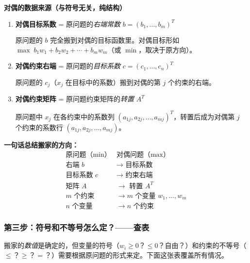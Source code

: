 \begin{defbox}
\textbf{对偶的数据来源（与符号无关，纯结构）}

\medskip
\begin{enumerate}
  \item \textbf{对偶目标系数} = 原问题的\emph{右端常数} $b = (b_1,\dots,b_m)^T$

  原问题的 $b$ 完全搬到对偶的目标函数里。对偶目标形如 $\max\; b_1 w_1 + b_2 w_2 + \cdots + b_m w_m$（或 $\min$，取决于原方向）。

  \item \textbf{对偶约束右端} = 原问题的\emph{目标系数} $c = (c_1,\dots,c_n)^T$

  原问题的 $c_j$（$x_j$ 在目标中的系数）搬到对偶的第 $j$ 个约束的右端。

  \item \textbf{对偶约束矩阵} = 原问题约束矩阵的\emph{转置} $A^T$

  原问题中 $x_j$ 在各约束中的系数列 $(a_{1j},a_{2j},\dots,a_{mj})^T$，转置后成为对偶第 $j$ 个约束的系数行 $(a_{1j},a_{2j},\dots,a_{mj})$。
\end{enumerate}
\end{defbox}

\medskip
\textbf{一句话总结搬家的方向：}
\[
\begin{array}{c|c}
\text{原问题（$\min$）} & \text{对偶问题（$\max$）} \\
\hline
\text{右端 } b & \longrightarrow \text{ 目标系数} \\
\text{目标系数 } c & \longrightarrow \text{ 约束右端} \\
\text{矩阵 } A & \longrightarrow \text{ 转置 } A^T \\
m \text{ 个约束} & \longrightarrow m \text{ 个变量 } w_1,\dots,w_m \\
n \text{ 个变量} & \longrightarrow n \text{ 个约束}
\end{array}
\]

\subsubsection{第三步：符号和不等号怎么定？——查表}

搬家的\emph{数值}是确定的，但变量的符号（$w_i \ge 0$？$\le 0$？自由？）和约束的不等号（$\le$？$\ge$？$=$？）需要根据原问题的形式来定。下面这张表覆盖所有情况。

